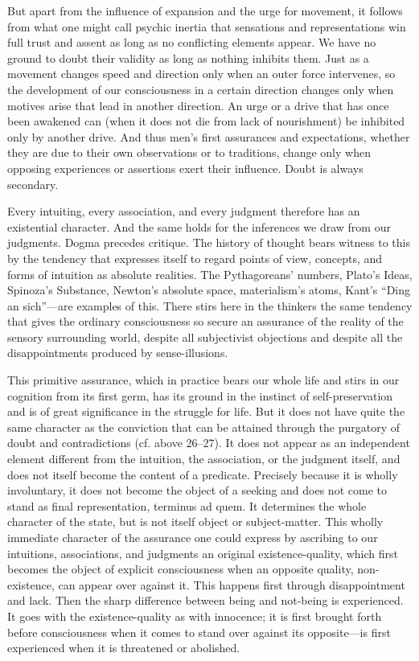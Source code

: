 \documentclass[12pt,a4paper]{book}
\newcommand{\opage}[1]{\marginnote{\footnotesize\textit{[#1]}}}
\begin{document}
But apart from the influence of expansion and the urge for movement, it
follows from what one might call psychic inertia that sensations and
representations win full trust and assent as long as no conflicting
elements appear. We have no ground to doubt their validity as long as
nothing inhibits them. Just as a movement changes speed and direction only
when an outer force intervenes, so the development of our consciousness in
a certain direction changes only when motives arise that lead in another
direction. An urge or a drive that has once been awakened can (when it
does not die from lack of nourishment) be inhibited only by another drive.
And thus men's first assurances and expectations, whether they are due to
their own observations or to traditions, change only when opposing
experiences or assertions exert their influence. Doubt is always
secondary.

\opage{101}Every intuiting, every association, and every judgment therefore has an
existential character. And the same holds for the inferences we draw from
our judgments. Dogma precedes critique. The history of thought bears
witness to this by the tendency that expresses itself to regard points of
view, concepts, and forms of intuition as absolute realities. The
Pythagoreans' numbers, Plato's Ideas, Spinoza's Substance, Newton's
absolute space, materialism's atoms, Kant's ``Ding an sich''---are
examples of this. There stirs here in the thinkers the same tendency that
gives the ordinary consciousness so secure an assurance of the reality of
the sensory surrounding world, despite all subjectivist objections and
despite all the disappointments produced by sense-illusions.

This primitive assurance, which in practice bears our whole life and stirs
in our cognition from its first germ, has its ground in the instinct of
self-preservation and is of great significance in the struggle for life.
But it does not have quite the same character as the conviction that can be
attained through the purgatory of doubt and contradictions (cf. above
26--27). It does not appear as an independent element different from the
intuition, the association, or the judgment itself, and does not itself
become the content of a predicate. Precisely because it is wholly
involuntary, it does not become the object of a seeking and does not come
to stand as final representation, terminus ad quem. It determines the
whole character of the state, but is not itself object or subject-matter.
This wholly immediate character of the assurance one could express by
ascribing to our intuitions, associations, and judgments an original
existence-quality, which first becomes the object of explicit
consciousness when an opposite quality, non-existence, can appear over
against it. This happens first through disappointment and lack. Then the
sharp difference between being and not-being is experienced. It goes with
the existence-quality as with innocence; it is first brought forth before
consciousness when it comes to stand over against its opposite---is first
experienced when it is threatened or abolished.
\end{document}

